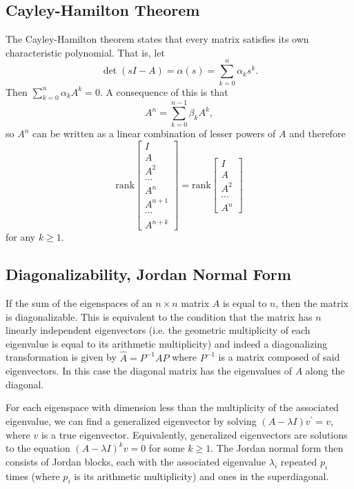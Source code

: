 \documentclass{report}
\begin{document}
\subsection{Cayley-Hamilton Theorem}
The Cayley-Hamilton theorem states that every matrix satisfies its own
characteristic polynomial. That is, let
$$
\det (sI - A) = \alpha(s) = \sum_{k=0}^{n} \alpha_k s^k.
$$
Then $\sum_{k=0}^{n} \alpha_k A^k = 0$. A consequence of this is
that
$$
A^n = \sum_{k=0}^{n-1} \beta_k A^k,
$$
so $A^n$ can be written as a linear combination of lesser powers of
$A$ and therefore
$$
\mathrm{rank}
\left[\begin{array}{c}
  I      \\
  A      \\
  A^2    \\
  \cdots \\
  A^n    \\
  A^{n+1} \\
  \cdots \\
  A^{n+k}
\end{array}\right]
=
\mathrm{rank}
\left[\begin{array}{c}
  I      \\
  A      \\
  A^2    \\
  \cdots \\
  A^n
\end{array}\right]
$$
for any $k \geq 1$.

\subsection{Diagonalizability, Jordan Normal Form}
If the sum of the eigenspaces of an $n \times n$ matrix $A$ is equal
to $n$, then the matrix is diagonalizable. This is equivalent to the
condition that the matrix has $n$ linearly independent eigenvectors
(i.e. the geometric multiplicity of each eigenvalue is equal to its
arithmetic multiplicity)
and indeed a diagonalizing transformation is given by
$\hat{A} = P^{-1} A P$ where $P^{-1}$ is a matrix composed of said
eigenvectors. In this case the diagonal matrix has the eigenvalues of
$A$ along the diagonal.

For each eigenspace with dimension less than the multiplicity of the
associated eigenvalue, we can find a generalized eigenvector by
solving $(A - \lambda I)v^\prime = v$, where $v$ is a true
eigenvector. Equivalently, generalized eigenvectors are solutions to
the equation $(A - \lambda I)^k v = 0$ for some $k \geq 1$. The Jordan
normal form then consists of Jordan blocks, each with the associated
eigenvalue $\lambda_i$ repeated $p_i$ times (where $p_i$ is its arithmetic
multiplicity) and ones in the superdiagonal.
\end{document}
